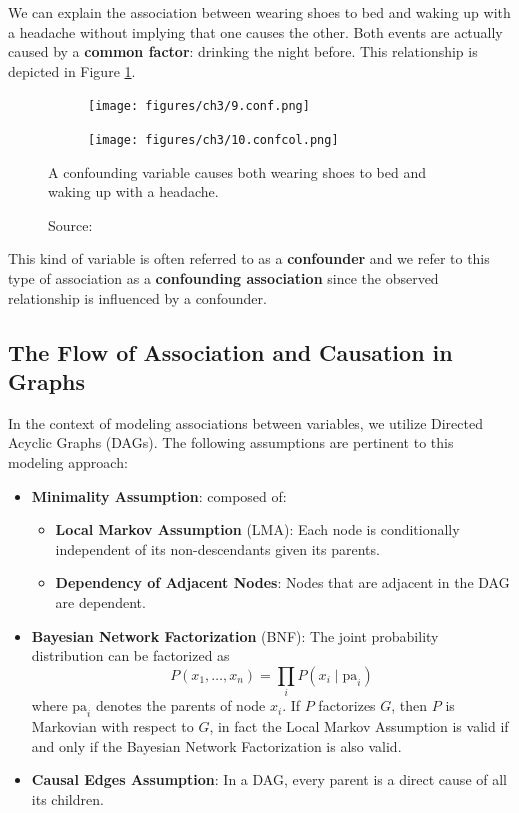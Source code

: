 We can explain the association between wearing shoes to bed and waking
up with a headache without implying that one causes the other.
Both events are actually caused by a \textbf{common factor}:
drinking the night before. This relationship is depicted
in Figure \ref{fig:confounding}.

\begin{figure}[h]
    \centering
    \begin{subfigure}{.5\textwidth}
      \centering
      \texttt{[image: figures/ch3/9.conf.png]}
    \end{subfigure}%
    \begin{subfigure}{.5\textwidth}
      \centering
      \texttt{[image: figures/ch3/10.confcol.png]}
    \end{subfigure}
    \caption{A confounding variable causes both wearing shoes to bed and waking up with a headache.}
    \vspace{-10px}
    \caption*{\scriptsize{Source: \cite{Neal_2020a}}}
    \label{fig:confounding}
\end{figure}

This kind of variable is often referred to as a \textbf{confounder} and
we refer to this type of association as a \textbf{confounding association}
since the observed relationship is influenced by a confounder.


\subsection{The Flow of Association and Causation in Graphs}
\label{sec:flow}

In the context of modeling associations between variables,
we utilize Directed Acyclic Graphs (DAGs).
The following assumptions are pertinent to this modeling approach:

\begin{itemize}
    \item \textbf{Minimality Assumption}: composed of:
    \begin{itemize}
        \item \textbf{Local Markov Assumption} (LMA):
        Each node is conditionally independent of its
        non-descendants given its parents.
        \item \textbf{Dependency of Adjacent Nodes}: Nodes that
        are adjacent in the DAG are dependent.
    \end{itemize}
    \item \textbf{Bayesian Network Factorization} (BNF): The joint probability
    distribution can be factorized as
    \begin{equation}
        P(x_1, \ldots, x_n) = \prod_i P(x_i \mid \text{pa}_i)
    \end{equation}
    where \( \text{pa}_i \) denotes the parents of node \( x_i \).
    If \( P \) factorizes \( G \), then \( P \) is Markovian with
    respect to \( G \), in fact the Local Markov Assumption is valid
    if and only if the Bayesian Network Factorization is also valid.
    \item \textbf{Causal Edges Assumption}: In a DAG, every parent is
    a direct cause of all its children.
\end{itemize}

